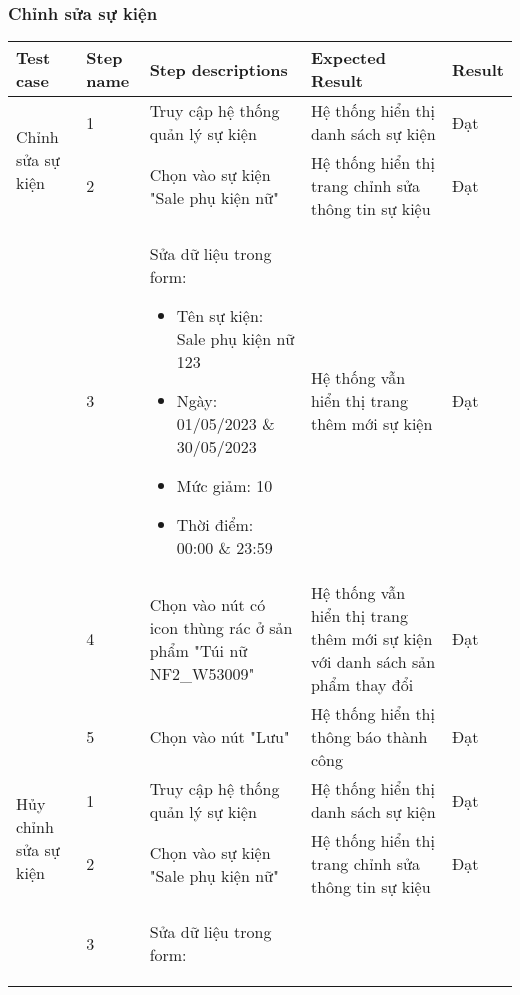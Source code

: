 \subsubsection{Chỉnh sửa sự kiện}
{
    \setlength\extrarowheight{6pt}
    \begin{longtable}{| p{2.5cm}| p{1cm}| p{5.5cm}| p{4.5cm} | p{1.5cm} |}
        \hline
        \textbf{Test case} & \textbf{Step name} & \textbf{Step descriptions} & \textbf{Expected Result} & \textbf{Result} \\
        \hline
        \multirow[t]{2}{2.5cm}{Chỉnh sửa sự kiện} & 1 & Truy cập hệ thống quản lý sự kiện & Hệ thống hiển thị danh sách sự kiện & Đạt \\
        \cline{2-5}
         & 2 & Chọn vào sự kiện "Sale phụ kiện nữ" & Hệ thống hiển thị trang chỉnh sửa thông tin sự kiệu & Đạt \\
        \cline{2-5}
        & 3 & Sửa dữ liệu trong form:
        \begin{itemize}
            \item Tên sự kiện: Sale phụ kiện nữ 123
            \item Ngày: 01/05/2023 \& 30/05/2023
            \item Mức giảm: 10
            \item Thời điểm: 00:00 \& 23:59 
        \end{itemize} & Hệ thống vẫn hiển thị trang thêm mới sự kiện & Đạt \\
        \cline{2-5}
         & 4 & Chọn vào nút có icon thùng rác ở sản phẩm "Túi nữ NF2\_W53009" & Hệ thống vẫn hiển thị trang thêm mới sự kiện với danh sách sản phẩm thay đổi & Đạt \\
         \cline{2-5}
         & 5 & Chọn vào nút "Lưu" & Hệ thống hiển thị thông báo thành công & Đạt \\
        \hline
        \multirow[t]{2}{2.5cm}{Hủy chỉnh sửa sự kiện} & 1 & Truy cập hệ thống quản lý sự kiện & Hệ thống hiển thị danh sách sự kiện & Đạt \\
        \cline{2-5}
         & 2 & Chọn vào sự kiện "Sale phụ kiện nữ" & Hệ thống hiển thị trang chỉnh sửa thông tin sự kiệu & Đạt \\
        \cline{2-5}
        & 3 & Sửa dữ liệu trong form:
        \begin{itemize}

\end{itemize}
\end{longtable}}

